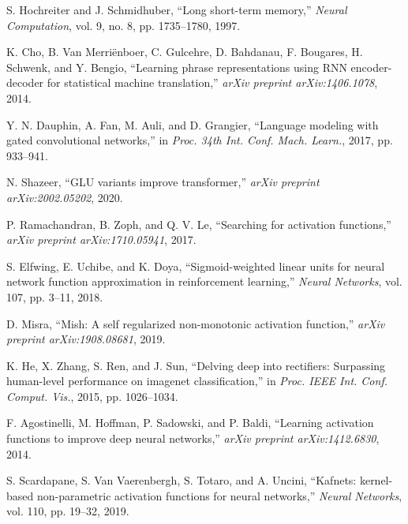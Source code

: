 \documentclass[lettersize,journal]{IEEEtran}
\begin{document}

\begin{thebibliography}{1}

S. Hochreiter and J. Schmidhuber, ``Long short-term memory,'' \textit{Neural Computation}, vol. 9, no. 8, pp. 1735--1780, 1997.

K. Cho, B. Van Merriënboer, C. Gulcehre, D. Bahdanau, F. Bougares, H. Schwenk, and Y. Bengio, ``Learning phrase representations using RNN encoder-decoder for statistical machine translation,'' \textit{arXiv preprint arXiv:1406.1078}, 2014.

Y. N. Dauphin, A. Fan, M. Auli, and D. Grangier, ``Language modeling with gated convolutional networks,'' in \textit{Proc. 34th Int. Conf. Mach. Learn.}, 2017, pp. 933--941.

N. Shazeer, ``GLU variants improve transformer,'' \textit{arXiv preprint arXiv:2002.05202}, 2020.

P. Ramachandran, B. Zoph, and Q. V. Le, ``Searching for activation functions,'' \textit{arXiv preprint arXiv:1710.05941}, 2017.

S. Elfwing, E. Uchibe, and K. Doya, ``Sigmoid-weighted linear units for neural network function approximation in reinforcement learning,'' \textit{Neural Networks}, vol. 107, pp. 3--11, 2018.

D. Misra, ``Mish: A self regularized non-monotonic activation function,'' \textit{arXiv preprint arXiv:1908.08681}, 2019.

K. He, X. Zhang, S. Ren, and J. Sun, ``Delving deep into rectifiers: Surpassing human-level performance on imagenet classification,'' in \textit{Proc. IEEE Int. Conf. Comput. Vis.}, 2015, pp. 1026--1034.

F. Agostinelli, M. Hoffman, P. Sadowski, and P. Baldi, ``Learning activation functions to improve deep neural networks,'' \textit{arXiv preprint arXiv:1412.6830}, 2014.

S. Scardapane, S. Van Vaerenbergh, S. Totaro, and A. Uncini, ``Kafnets: kernel-based non-parametric activation functions for neural networks,'' \textit{Neural Networks}, vol. 110, pp. 19--32, 2019.


\end{thebibliography}
\end{document}
